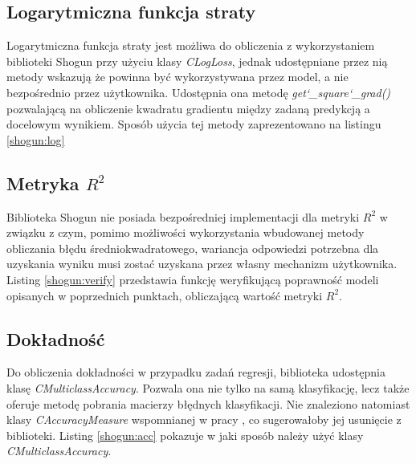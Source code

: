
\subsection{Logarytmiczna funkcja straty}

Logarytmiczna funkcja straty jest możliwa do obliczenia z wykorzystaniem biblioteki Shogun przy użyciu klasy \textit{CLogLoss}, jednak udostępniane przez nią metody wskazują że powinna być wykorzystywana przez model, a nie bezpośrednio przez użytkownika. Udostępnia ona metodę \textit{get\char`_square\char`_grad()} pozwalającą na obliczenie kwadratu gradientu między zadaną predykcją a docelowym wynikiem. Sposób użycia tej metody zaprezentowano na listingu \ref{shogun:log}


\subsection{Metryka $R^2$}

Biblioteka Shogun nie posiada bezpośredniej implementacji dla metryki $R^2$ w związku z czym, pomimo możliwości wykorzystania wbudowanej metody obliczania błędu średniokwadratowego, wariancja odpowiedzi potrzebna dla uzyskania wyniku musi zostać uzyskana przez własny mechanizm użytkownika. Listing \ref{shogun:verify} przedstawia funkcję weryfikującą poprawność modeli opisanych w poprzednich punktach, obliczającą wartość metryki $R^2$.


\subsection{Dokładność}

Do obliczenia dokładności w przypadku zadań regresji, biblioteka udostępnia klasę \textit{CMulticlassAccuracy}. Pozwala ona nie tylko na samą klasyfikację, lecz także oferuje metodę pobrania macierzy błędnych klasyfikacji. Nie znaleziono natomiast klasy \textit{CAccuracyMeasure} wspomnianej w pracy \cite{handsOnMachineLearning}, co sugerowałoby jej usunięcie z biblioteki. Listing \ref{shogun:acc} pokazuje w jaki sposób należy użyć klasy \textit{CMulticlassAccuracy}.

